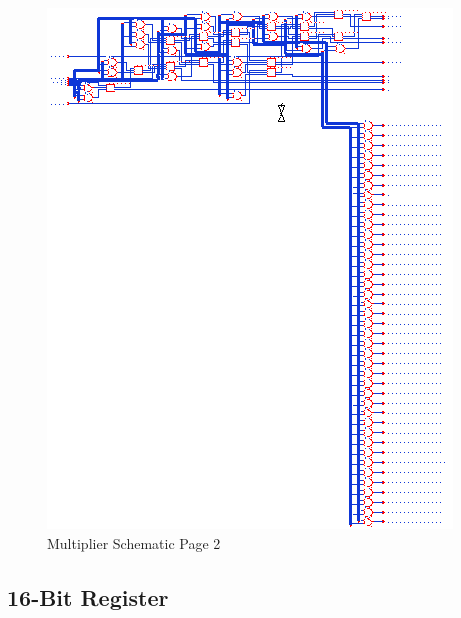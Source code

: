 \documentclass[11pt]{article}
\begin{document}
		
		\begin{figure}[H] 
			\centering 
			\includegraphics[width=\textwidth,height=\dimexpr\textheight-4\baselineskip-\abovecaptionskip-\belowcaptionskip\relax,keepaspectratio]{"Pictures/Multiplier Schematic Page 2"}
			\caption{Multiplier Schematic Page 2} 
			\label{fig:Multiplier-Schematic-Page-2} 
		\end{figure}
	
	\subsection{16-Bit Register}
\end{document}
